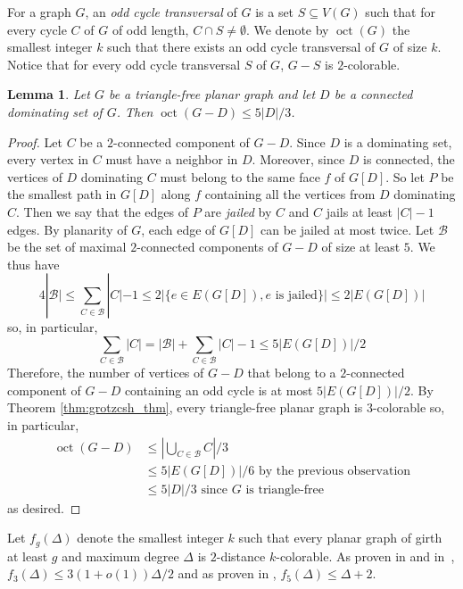 \documentclass{article}
\newtheorem{lemma}[theorem]{Lemma}
\newcommand{\oct}[0]{\operatorname{oct}}
\begin{document}
For a graph $G$, an \emph{odd cycle transversal} of $G$ is a set $S \subseteq V(G)$ such that for every cycle $C$ of $G$ of odd length, $C \cap S \neq \emptyset$. We denote by $\oct(G)$ the smallest integer $k$ such that there exists an odd cycle transversal of $G$ of size $k$. Notice that for every odd cycle transversal $S$ of $G$, $G - S$ is $2$-colorable.

\begin{lemma}\label{lemma:oct_bound}
    Let $G$ be a triangle-free planar graph and let $D$ be a connected dominating set of $G$. Then $\oct(G - D) \le 5|D|/3$.
\end{lemma}

\begin{proof}
    Let $C$ be a $2$-connected component of $G - D$. Since $D$ is a dominating set, every vertex in $C$ must have a neighbor in $D$. Moreover, since $D$ is connected, the vertices of $D$ dominating $C$ must belong to the same face $f$ of $G[D]$. So let $P$ be the smallest path in $G[D]$ along $f$ containing all the vertices from $D$ dominating $C$. Then we say that the edges of $P$ are \emph{jailed} by $C$ and $C$ jails at least $|C| - 1$ edges. By planarity of $G$, each edge of $G[D]$ can be jailed at most twice. Let $\mathcal{B}$ be the set of maximal $2$-connected components of $G - D$ of size at least $5$. We thus have
    \[4|\mathcal{B| \le }\sum_{C \in \mathcal{B}} |C| - 1 \le 2|\{e\in E(G[D]), e \textrm{ is jailed}\}| \le 2|E(G[D])|\]
    so, in particular, 
    \[\sum_{C \in \mathcal{B}} |C| = |\mathcal{B}| + \sum_{C \in \mathcal{B}} |C| - 1 \le  5|E(G[D])|/2\]
    Therefore, the number of vertices of $G - D$ that belong to a $2$-connected component of $G - D$ containing an odd cycle is at most $5|E(G[D])|/2$. By Theorem \ref{thm:grotzcsh_thm}, every triangle-free planar graph is $3$-colorable so, in particular,
    \begin{align*}
        \oct(G - D) &\le |\bigcup_{C \in \mathcal{B}}C|/3 \\
        &\le 5|E(G[D])|/6 \textrm{ by the previous observation}\\
        &\le 5|D|/3 \textrm{ since $G$ is triangle-free}
    \end{align*}
    as desired.
\end{proof}


Let $f_g(\Delta)$ denote the smallest integer $k$ such that every planar graph of girth at least $g$ and maximum degree $\Delta$ is $2$-distance $k$-colorable. As proven in \cite{amini2013unified} and in~\cite{havet2017listcolouringsquaresplanar}, $f_3(\Delta) \le 3(1 + o(1))\Delta/2$ and as proven in \cite{BONAMY2019218}, $f_5(\Delta) \le \Delta + 2$.
\end{document}
